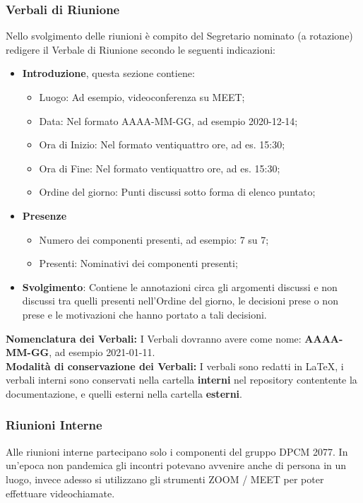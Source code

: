 \subsubsection{Verbali di Riunione}
Nello svolgimento delle riunioni è compito del Segretario nominato (a rotazione) redigere il Verbale di Riunione secondo le seguenti indicazioni:
\begin{itemize}
\item{\textbf{Introduzione}, questa sezione contiene:}
	\begin{itemize}
	\item{Luogo: Ad esempio, videoconferenza su MEET;}
	\item{Data: Nel formato AAAA-MM-GG, ad esempio 2020-12-14;}
	\item{Ora di Inizio:  Nel formato ventiquattro ore, ad es. 15:30;}
	\item{Ora di Fine:  Nel formato ventiquattro ore, ad es. 15:30;}
	\item{Ordine del giorno: Punti discussi sotto forma di elenco puntato;}
	\end{itemize}
\item{\textbf{Presenze}}
	\begin{itemize}
	\item{Numero dei componenti presenti, ad esempio: 7 su 7;}
	\item{Presenti: Nominativi dei componenti presenti;}
	\end{itemize}
\item{\textbf{Svolgimento}: Contiene le annotazioni circa gli argomenti discussi e non discussi tra quelli presenti nell’Ordine del giorno, le decisioni prese o non prese e le motivazioni che hanno portato a tali decisioni.}
\end{itemize}
\textbf{Nomenclatura dei Verbali: } I Verbali dovranno avere come nome: \textbf{AAAA-MM-GG}, ad esempio 2021-01-11. \\
\textbf{Modalità di conservazione dei Verbali:} I verbali sono redatti in \LaTeX, i verbali interni sono conservati nella cartella \textbf{interni} nel repository  contentente la documentazione, e quelli esterni nella cartella \textbf{esterni}.

\subsubsection{Riunioni Interne}
Alle riunioni interne partecipano solo i componenti del gruppo DPCM 2077.
In un'epoca non pandemica gli incontri potevano avvenire anche di persona in un luogo, invece adesso si utilizzano gli strumenti ZOOM / MEET per poter effettuare videochiamate.

